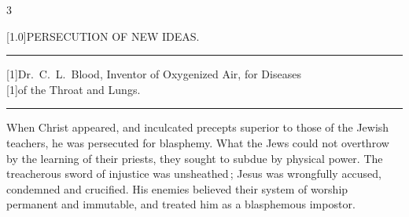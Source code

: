 \documentclass[10pt]{article}
\begin{document}
%
%
\begin{multicols}{3}
	\begin{centering}
		\Large \scalebox{1.2}[1.0]{PERSECUTION OF NEW IDEAS.}

		\vspace{3mm}

		\rule[3pt]{2em}{0.7pt}

		\vspace{2mm}

		\large \scalebox{1.15}[1]{Dr.~C.~L.~Blood, Inventor of Oxygenized
		Air, for Diseases}\\[2.5mm]
		\scalebox{1.15}[1]{of the Throat and Lungs.}

		\vspace{3mm}

		\rule[3pt]{2em}{0.7pt}

		\vspace{2mm}

	\end{centering}

	\openup 1.09mm
	When Christ appeared, and inculcated precepts superior to those of
	the\linebreak
	Jewish teachers, he was persecuted for blasphemy. What the Jews could\linebreak
	not overthrow by the learning of their priests, they sought to
	subdue by\linebreak
	physical power. The treacherous sword of injustice was unsheathed\,;\linebreak
	Jesus was wrongfully accused, condemned and crucified. His enemies\linebreak
	believed their system of worship permanent and immutable, and
	treated him\linebreak
	as a blasphemous impostor.


\end{multicols}
\end{document}
